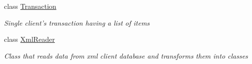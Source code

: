 \begin{DoxyCompactItemize}
class \hyperlink{class_apriori_all_lib_1_1_transaction}{Transaction}
\begin{DoxyCompactList}\small\item\em Single client's transaction having a list of items \end{DoxyCompactList}\item 
class \hyperlink{class_apriori_all_lib_1_1_xml_reader}{Xml\-Reader}
\begin{DoxyCompactList}\small\item\em Class that reads data from xml client database and transforms them into classes \end{DoxyCompactList}\end{DoxyCompactItemize}
